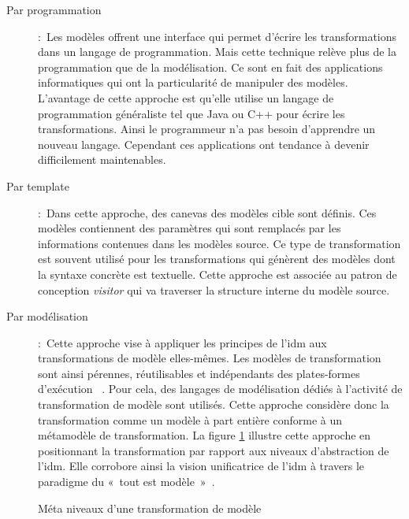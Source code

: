 \begin{description}

\item[Par programmation]:~Les modèles offrent une interface qui permet d'écrire les transformations dans 
un langage de programmation. Mais cette technique relève plus de la 
programmation que de la modélisation. Ce sont en fait des applications 
informatiques qui ont la particularité de manipuler des modèles. L'avantage de 
cette approche est qu'elle utilise un langage de programmation généraliste tel 
que Java ou C++ pour écrire les transformations. Ainsi le programmeur n'a pas 
besoin d'apprendre un nouveau langage. Cependant ces applications ont tendance à 
devenir difficilement maintenables.

\item [Par template]:~Dans cette approche, des canevas des modèles cible sont définis. Ces modèles contiennent des paramètres qui sont remplacés par les informations contenues 
dans les modèles source. Ce type de transformation est souvent utilisé pour les 
transformations qui génèrent des modèles dont la syntaxe concrète est textuelle.  Cette approche est associée au patron de conception \textit{visitor} qui va traverser la structure interne du modèle source. 

\item [Par modélisation]:~Cette approche vise à appliquer les principes de l'\gls{idm} aux transformations de modèle elles-mêmes. Les modèles de transformation sont ainsi pérennes, réutilisables et indépendants des plates-formes d'exécution ~\cite{bezivin2006model}. Pour cela, des langages de modélisation dédiés à l'activité de transformation de modèle sont utilisés. Cette approche considère donc la transformation comme 
un modèle à part entière conforme à un métamodèle de transformation. La figure 
\ref{fig:TransfoPrincipe} illustre cette approche en positionnant la transformation par rapport aux niveaux d'abstraction de l'\gls{idm}. Elle corrobore 
ainsi la vision unificatrice de l'\gls{idm} à travers le paradigme du «~tout est 
modèle~»~\cite{bezivin2005unification}.
\end{description}


\begin{figure}[!ht]
 \begin{center}
  
 \end{center}
 \caption{Méta niveaux d'une transformation de modèle}
 \label{fig:TransfoPrincipe}
\end{figure}


